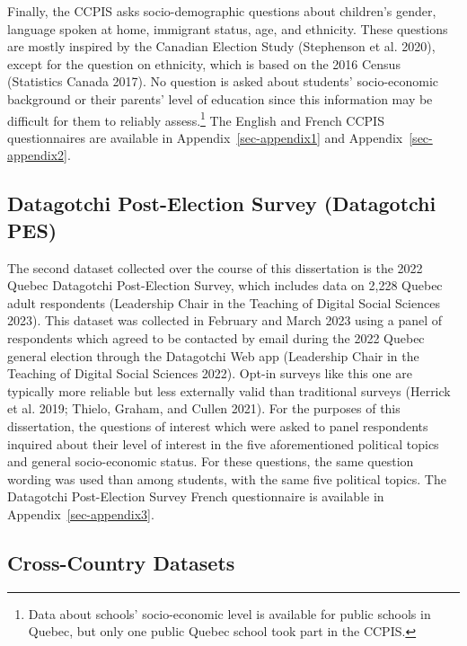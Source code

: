 \documentclass[
  letterpaper,
  DIV=11,
  numbers=noendperiod]{scrreprt}
\begin{document}
Finally, the CCPIS asks socio-demographic questions about children's
gender, language spoken at home, immigrant status, age, and ethnicity.
These questions are mostly inspired by the Canadian Election Study
(Stephenson et al. 2020), except for the question on ethnicity, which is
based on the 2016 Census (Statistics Canada 2017). No question is asked
about students' socio-economic background or their parents' level of
education since this information may be difficult for them to reliably
assess.\footnote{Data about schools' socio-economic level is available
  for public schools in Quebec, but only one public Quebec school took
  part in the CCPIS.} The English and French CCPIS questionnaires are
available in Appendix~\ref{sec-appendix1} and
Appendix~\ref{sec-appendix2}.

\hypertarget{datagotchi-post-election-survey-datagotchi-pes}{%
\subsection{Datagotchi Post-Election Survey (Datagotchi
PES)}\label{datagotchi-post-election-survey-datagotchi-pes}}

The second dataset collected over the course of this dissertation is the
2022 Quebec Datagotchi Post-Election Survey, which includes data on
2,228 Quebec adult respondents (Leadership Chair in the Teaching of
Digital Social Sciences 2023). This dataset was collected in February
and March 2023 using a panel of respondents which agreed to be contacted
by email during the 2022 Quebec general election through the Datagotchi
Web app (Leadership Chair in the Teaching of Digital Social Sciences
2022). Opt-in surveys like this one are typically more reliable but less
externally valid than traditional surveys (Herrick et al. 2019; Thielo,
Graham, and Cullen 2021). For the purposes of this dissertation, the
questions of interest which were asked to panel respondents inquired
about their level of interest in the five aforementioned political
topics and general socio-economic status. For these questions, the same
question wording was used than among students, with the same five
political topics. The Datagotchi Post-Election Survey French
questionnaire is available in Appendix~\ref{sec-appendix3}.

\hypertarget{cross-country-datasets}{%
\subsection{Cross-Country Datasets}\label{cross-country-datasets}}
\end{document}
